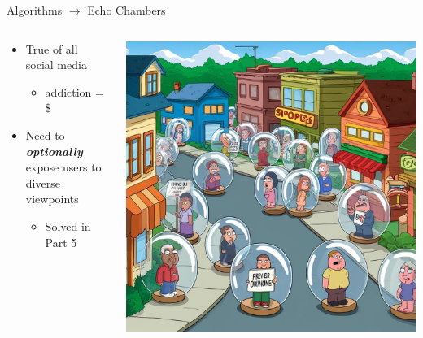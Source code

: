 \documentclass[aspectratio=169]{beamer}
\begin{document}
\begin{frame}{Algorithms $\rightarrow$ Echo Chambers}
\begin{columns}[T]
    \begin{column}[T]{0.5\textwidth}
        \begin{itemize}
            \item True of all social media
            \begin{itemize}
                \item addiction = \$
            \end{itemize}
            \item Need to \textit{\textbf{optionally}} expose users to diverse viewpoints
            \begin{itemize}
                \item Solved in Part 5
            \end{itemize}
        \end{itemize}
    \end{column}
    \begin{column}{0.5\textwidth}
        \includegraphics[height=0.8\textheight]{imgs/why_replace/bubble_town.jpeg}
    \end{column}
\end{columns}
\end{frame}
\end{document}
